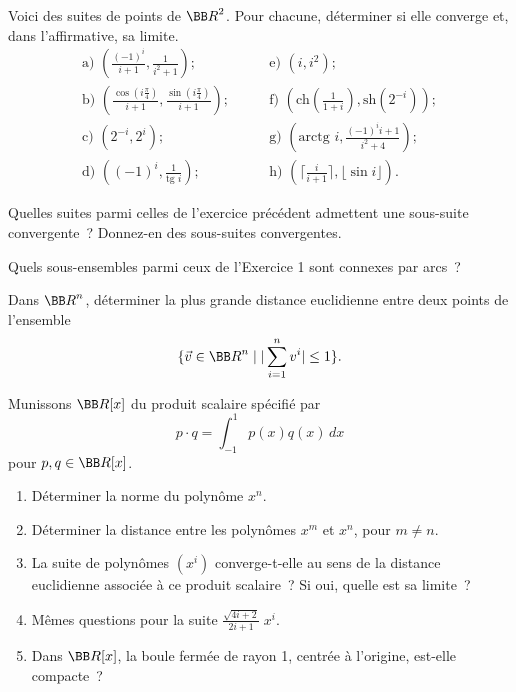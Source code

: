 \documentclass[12pt,french,oneside,a4paper]{memoir} %
\begin{document}
\begin{exo}
Voici des suites de points de ${\BB R}^2$. Pour chacune, déterminer si
elle converge et, dans l'affirmative, sa limite.
\begin{equation*}
\begin{array}{ll}
\mbox{a) } \displaystyle{\left( \frac{(-1)^i}{i+1}, \frac{1}{i^2+1} \right)}; 
&\mbox{e) } (i,i^2); \\
\mbox{b) } \displaystyle{\left( \frac{\cos(i \frac{\pi}{4})}{i+1}, \frac{\sin(i
\frac{\pi}{4})}{i+1} \right)}; \qquad 
&\mbox{f) } \displaystyle{\left( \mbox{ch}(\frac{1}{1+i}), 
\mbox{sh}(2^{-i}) \right)}; \\
\mbox{c) } (2^{-i},2^i); &\mbox{g) } \left( \mbox{arctg }i,
\displaystyle{\frac{(-1)^ii+1}{i^2+4}}\right); \\
\mbox{d) } \displaystyle{\left( (-1)^i, \frac{1}{\mbox{tg }i} \right) }; 
&\mbox{h) } \displaystyle{\left( \lceil \frac{i}{i+1} \rceil,\lfloor \sin i
\rfloor \right)}. 
\end{array}
\end{equation*}
\end{exo}
\begin{exo}
Quelles suites parmi celles de l'exercice précédent admettent une sous-suite convergente~? Donnez-en des sous-suites convergentes.
\end{exo}
\begin{exo}
Quels sous-ensembles parmi ceux de l'Exercice 1 sont connexes par arcs~?
\end{exo}
\begin{exo}
Dans ${\BB R}^n$, déterminer la plus grande distance euclidienne entre
deux points de l'ensemble
\begin{equation*}
\{ \vec{v} \in {\BB R}^n \mid \vert \sum_{i=1}^n v^i \vert \leq 1\}.
\end{equation*}
\end{exo}
\begin{exo}
Munissons ${\BB R}[x]$ du produit scalaire spécifié par 
$$
p \cdot q = \int_{-1}^1 p(x) q(x) \, dx
$$
pour $p,q \in {\BB R}[x]$. 
\begin{enumerate}
\item Déterminer la norme du polynôme $x^n$. 
\item Déterminer la distance entre les polynômes $x^m$ et $x^n$, pour $m
\neq n$.
\item La suite de polynômes $(x^i)$ converge-t-elle au sens de la
distance euclidienne associée à ce produit scalaire~? Si oui, quelle est sa
limite~? 
\item Mêmes questions pour la suite $\displaystyle{\frac{\sqrt{4i+2}}{2i+1}\; x^i}$.
\item Dans ${\BB R}[x]$, la boule fermée de rayon 1, centrée à l'origine, est-elle compacte~?
\end{enumerate}
\end{exo}
\end{document}
